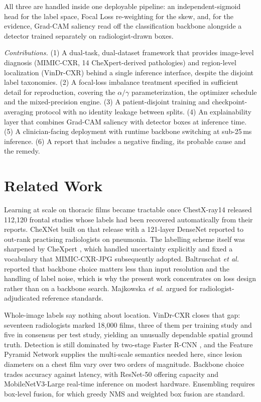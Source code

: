 \documentclass[conference]{IEEEtran}
\begin{document}
All three are handled inside one deployable pipeline: an independent-sigmoid
head for the label space, Focal Loss re-weighting for the skew, and, for the
evidence, Grad-CAM saliency read off the classification backbone alongside a
detector trained separately on radiologist-drawn boxes.

\textit{Contributions.} (1) A dual-task, dual-dataset framework that provides
image-level diagnosis (MIMIC-CXR, 14 CheXpert-derived pathologies) and
region-level localization (VinDr-CXR) behind a single inference interface,
despite the disjoint label taxonomies. (2) A focal-loss imbalance treatment
specified in sufficient detail for reproduction, covering the $\alpha/\gamma$
parameterization, the optimizer schedule and the mixed-precision engine. (3) A
patient-disjoint training and checkpoint-averaging protocol with no identity
leakage between splits. (4) An explainability layer that combines Grad-CAM
saliency with detector boxes at inference time. (5) A clinician-facing
deployment with runtime backbone switching at sub-25\,ms inference. (6) A report that includes a negative
finding, its probable cause and the remedy.

\section{Related Work}

Learning at scale on thoracic films became tractable once ChestX-ray14
\cite{wang2017} released 112,120 frontal studies whose labels had been recovered
automatically from their reports. CheXNet \cite{rajpurkar2017} built on that
release with a 121-layer DenseNet reported to out-rank practising radiologists
on pneumonia. The labelling scheme itself was sharpened by CheXpert
\cite{irvin2019}, which handled uncertainty explicitly and fixed a vocabulary
that MIMIC-CXR-JPG \cite{johnson2019jpg} subsequently adopted. Baltruschat
\textit{et al.} \cite{baltruschat2019} reported that backbone choice matters
less than input resolution and the handling of label noise, which is why the
present work concentrates on loss design rather than on a backbone search.
Majkowska \textit{et al.} \cite{majkowska2020} argued for
radiologist-adjudicated reference standards.

Whole-image labels say nothing about location. VinDr-CXR \cite{nguyen2022}
closes that gap: seventeen radiologists marked 18,000 films, three of them per
training study and five in consensus per test study, yielding an unusually
dependable spatial ground truth.
Detection is still dominated by two-stage Faster R-CNN \cite{ren2015}, and the
Feature Pyramid Network \cite{lin2017fpn} supplies the multi-scale semantics
needed here, since lesion diameters on a chest film vary over two orders of
magnitude. Backbone choice trades accuracy against latency, with ResNet-50
\cite{he2016} offering capacity and MobileNetV3-Large \cite{howard2019}
real-time inference on modest hardware. Ensembling requires box-level
fusion, for which greedy NMS and weighted box fusion \cite{solovyev2021} are
standard.
\end{document}
